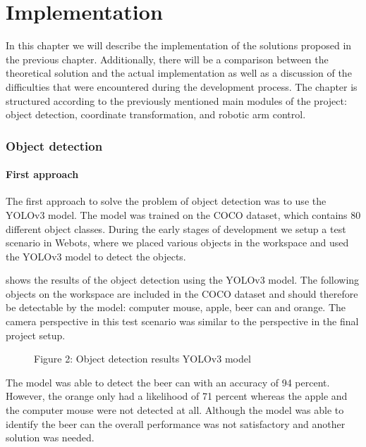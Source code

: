 \chapter{Implementation} %

\label{implementation} %


In this chapter we will describe the implementation of the solutions proposed in the previous chapter. Additionally, there will be a comparison between the theoretical solution and the actual implementation as well as a discussion of the difficulties that were encountered during the development process. The chapter is structured according to the previously mentioned main modules of the project: object detection, coordinate transformation, and robotic arm control.
\subsection{Object detection}

\subsubsection{First approach}
The first approach to solve the problem of object detection was to use the YOLOv3 model. The model was trained on the COCO dataset, which contains 80 different object classes. During the early stages of development we setup a test scenario in Webots, where we placed various objects in the workspace and used the YOLOv3 model to detect the objects. 

 shows the results of the object detection using the YOLOv3 model. The following objects on the workspace are included in the COCO dataset and should therefore be detectable by the model: computer mouse, apple, beer can and orange. The camera perspective in this test scenario was similar to the perspective in the final project setup.  

\begin{figure}[!h]
    \centering
    \caption{Figure 2: Object detection results YOLOv3 model }
    \label{fig:object_detection_results}
\end{figure}


The model was able to detect the beer can with an accuracy of 94 percent. However, the orange only had a likelihood of 71 percent whereas the apple and the computer mouse were not detected at all. Although the model was able to identify the beer can the overall performance was not satisfactory and another solution was needed.

